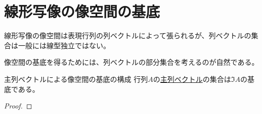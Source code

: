 \documentclass[../../../topic_linear-algebra]{subfiles}
\begin{document}
\sectionline
\section{線形写像の像空間の基底}

線形写像の像空間は表現行列の列ベクトルによって張られるが、列ベクトルの集合は一般には線型独立ではない。

像空間の基底を得るためには、列ベクトルの部分集合を考えるのが自然である。

\begin{theorem}{主列ベクトルによる像空間の基底の構成}\label{thm:pivot-cols-form-basis}
  行列$A$の\hyperref[def:pivot-columns]{主列ベクトル}の集合は$\Im A$の基底である。
\end{theorem}

\begin{proof}
\end{proof}
\end{document}
